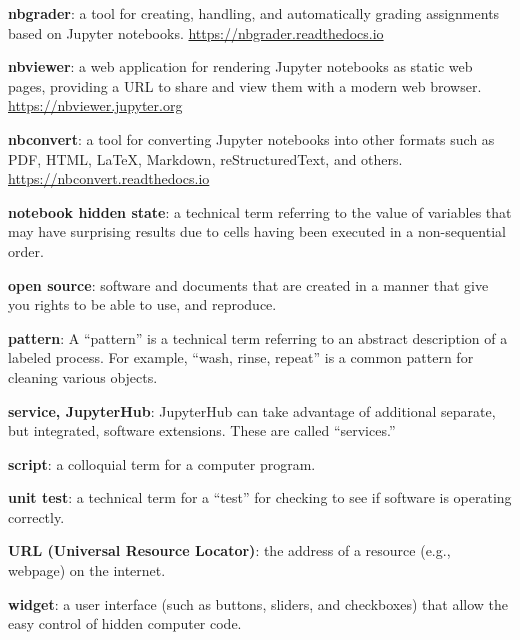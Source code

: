 \documentclass[]{book}
\begin{document}
\textbf{nbgrader}: a tool for creating, handling, and automatically
grading assignments based on Jupyter notebooks.
\url{https://nbgrader.readthedocs.io}

\textbf{nbviewer}: a web application for rendering Jupyter notebooks as
static web pages, providing a URL to share and view them with a modern
web browser. \url{https://nbviewer.jupyter.org}

\textbf{nbconvert}: a tool for converting Jupyter notebooks into other
formats such as PDF, HTML, LaTeX, Markdown, reStructuredText, and
others. \url{https://nbconvert.readthedocs.io}

\textbf{notebook hidden state}: a technical term referring to the value
of variables that may have surprising results due to cells having been
executed in a non-sequential order.

\textbf{open source}: software and documents that are created in a
manner that give you rights to be able to use, and reproduce.

\textbf{pattern}: A ``pattern'' is a technical term referring to an
abstract description of a labeled process. For example, ``wash, rinse,
repeat'' is a common pattern for cleaning various objects.

\textbf{service, JupyterHub}: JupyterHub can take advantage of
additional separate, but integrated, software extensions. These are
called ``services.''

\textbf{script}: a colloquial term for a computer program.

\textbf{unit test}: a technical term for a ``test'' for checking to see
if software is operating correctly.

\textbf{URL (Universal Resource Locator)}: the address of a resource
(e.g., webpage) on the internet.

\textbf{widget}: a user interface (such as buttons, sliders, and
checkboxes) that allow the easy control of hidden computer code.


\end{document}
